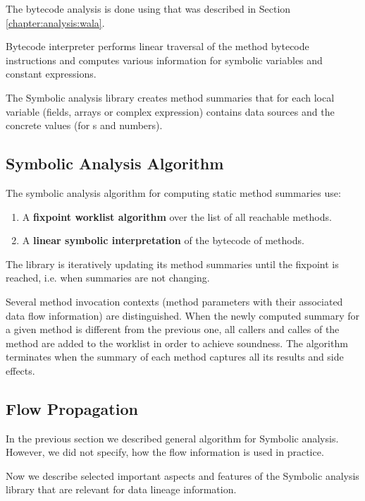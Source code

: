 The bytecode analysis is done using \citet{WalaFramework}
that was described in Section \ref{chapter:analysis:wala}.

Bytecode interpreter performs linear traversal of the method bytecode instructions
and computes various information for symbolic variables and constant expressions.

The Symbolic analysis library creates method summaries that for each
local variable (fields, arrays or complex expression) contains
data sources and the concrete values (for s and numbers).



\subsection{Symbolic Analysis Algorithm \label{chapter:analysis:algorithm}}

The symbolic analysis algorithm for computing static method summaries use:
\begin{enumerate}
  \item A \textbf{fixpoint worklist algorithm} over the list of all reachable methods.
  \item A \textbf{linear symbolic interpretation} of the bytecode of methods.
\end{enumerate}

The library is iteratively updating its method summaries until the fixpoint is reached, i.e.
when summaries are not changing.

Several method invocation contexts (method parameters with their associated data flow information)
are distinguished. When the newly computed summary for a given method is different from the previous
one, all callers and calles of the method are added to the worklist in order to achieve soundness.
The algorithm terminates when the summary of each method captures all its results and side effects.




\subsection{Flow Propagation}

In the previous section we described general algorithm for Symbolic analysis.
However, we did not specify, how the flow information is used in practice.

Now we describe selected important aspects and features of the Symbolic analysis library
that are relevant for data lineage information.




